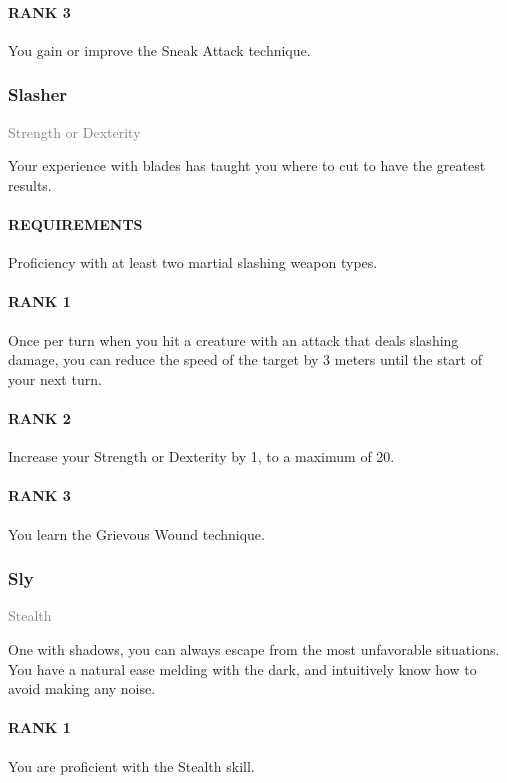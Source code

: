 \paragraph{RANK 3} You gain or improve the Sneak Attack technique.

\subsubsection{Slasher} \label{feat::slasher}
\small{\textcolor{gray}{Strength or Dexterity}}

\normalsize
Your experience with blades has taught you where to cut to have the greatest results.
\paragraph{REQUIREMENTS} Proficiency with at least two martial slashing weapon types.
\paragraph{RANK 1} Once per turn when you hit a creature with an attack that deals slashing damage, you can reduce the speed of the target by 3 meters until the start of your next turn.
\paragraph{RANK 2} Increase your Strength or Dexterity by 1, to a maximum of 20.
\paragraph{RANK 3} You learn the Grievous Wound technique.

\subsubsection{Sly} \label{feat::sly}
\small{\textcolor{gray}{Stealth}}

\normalsize
One with shadows, you can always escape from the most unfavorable situations.
You have a natural ease melding with the dark, and intuitively know how to avoid making any noise.
\paragraph{RANK 1} You are proficient with the Stealth skill.
